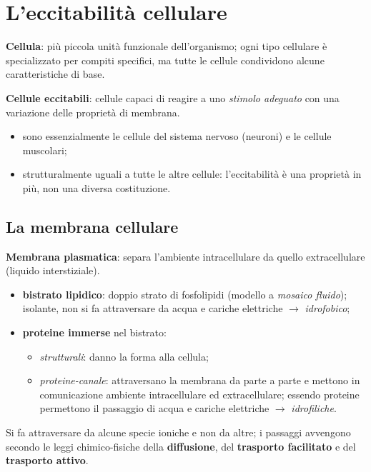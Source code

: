 \chapter{L'eccitabilità cellulare}

\textbf{Cellula}: più piccola unità funzionale dell'organismo; ogni tipo cellulare è specializzato
per compiti specifici, ma tutte le cellule condividono alcune caratteristiche di base.

\textbf{Cellule eccitabili}: cellule capaci di reagire a uno \textit{stimolo adeguato} con una
variazione delle proprietà di membrana.
\begin{itemize}
  \item sono essenzialmente le cellule del sistema nervoso (neuroni) e le cellule muscolari;
  \item strutturalmente uguali a tutte le altre cellule: l'eccitabilità è una proprietà in più,
    non una diversa costituzione.
\end{itemize}

\section{La membrana cellulare}

\textbf{Membrana plasmatica}: separa l'ambiente intracellulare da quello extracellulare (liquido
interstiziale).

\begin{itemize}
  \item \textbf{bistrato lipidico}: doppio strato di fosfolipidi (modello a \textit{mosaico
    fluido}); isolante, non si fa attraversare da acqua e cariche elettriche $\rightarrow$
    \textit{idrofobico};
  \item \textbf{proteine immerse} nel bistrato:
    \begin{itemize}
      \item \textit{strutturali}: danno la forma alla cellula;
      \item \textit{proteine-canale}: attraversano la membrana da parte a parte e mettono in
        comunicazione ambiente intracellulare ed extracellulare; essendo proteine permettono il
        passaggio di acqua e cariche elettriche $\rightarrow$ \textit{idrofiliche}.
    \end{itemize}
\end{itemize}

Si fa attraversare da alcune specie ioniche e non da altre; i passaggi avvengono secondo le leggi
chimico-fisiche della \textbf{diffusione}, del \textbf{trasporto facilitato} e del \textbf{trasporto
attivo}.

